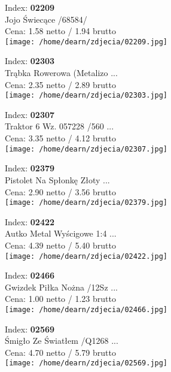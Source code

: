 {Index: \textbf{02209}\\
Jojo Świecące /68584/\\
Cena: 1.58 netto / 1.94 brutto\\
  \texttt{[image: /home/dearn/zdjecia/02209.jpg]}}\newline\newline

{Index: \textbf{02303}\\
Trąbka Rowerowa (Metalizo ...\\
Cena: 2.35 netto / 2.89 brutto\\
  \texttt{[image: /home/dearn/zdjecia/02303.jpg]}}\newline\newline

{Index: \textbf{02307}\\
Traktor 6 Wz. 057228 /560 ...\\
Cena: 3.35 netto / 4.12 brutto\\
  \texttt{[image: /home/dearn/zdjecia/02307.jpg]}}\newline\newline

{Index: \textbf{02379}\\
Pistolet Na Spłonkę Złoty ...\\
Cena: 2.90 netto / 3.56 brutto\\
  \texttt{[image: /home/dearn/zdjecia/02379.jpg]}}\newline\newline

{Index: \textbf{02422}\\
Autko Metal Wyścigowe 1:4 ...\\
Cena: 4.39 netto / 5.40 brutto\\
  \texttt{[image: /home/dearn/zdjecia/02422.jpg]}}\newline\newline

{Index: \textbf{02466}\\
Gwizdek Piłka Nożna /12Sz ...\\
Cena: 1.00 netto / 1.23 brutto\\
  \texttt{[image: /home/dearn/zdjecia/02466.jpg]}}\newline\newline

{Index: \textbf{02569}\\
Śmigło Ze Światłem /Q1268 ...\\
Cena: 4.70 netto / 5.79 brutto\\
  \texttt{[image: /home/dearn/zdjecia/02569.jpg]}}\newline\newline

